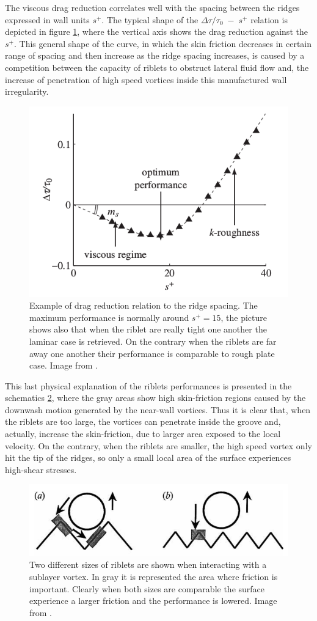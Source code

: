 The viscous drag reduction correlates well with the spacing between the ridges expressed in wall units $ s^+ $. The typical shape of the $\Delta \tau/\tau_0 \; - \; s^+$ relation is depicted in figure \ref{fig:riblets_perf}, where the vertical axis shows the drag reduction against the $s^+$.
This general shape of the curve, in which the skin friction decreases in certain range of spacing and then increase as the ridge spacing  increases, is caused by a competition between the capacity of riblets to obstruct lateral fluid flow and, the increase of penetration of high speed vortices inside this manufactured wall irregularity.

\begin{figure}[h]
	\centering
	\includegraphics[width=0.5\linewidth]{chapter_1/riblets_performance}
	\caption{Example of drag reduction relation to the ridge spacing. The maximum performance is normally around $ s^+ = 15 $, the picture shows also that when the riblet are really tight one another the laminar case is retrieved. On the contrary when the riblets are far away one another their performance is comparable to rough plate case. Image from \citet{jimenez2001turbulent}. }
	\label{fig:riblets_perf}
\end{figure}

This last physical explanation of the riblets performances is presented in the schematics \ref{fig:riblets_schem}, where the gray areas show high skin-friction regions caused by the downwash motion generated by the near-wall vortices.
Thus it is clear that, when the riblets are too large, the vortices can penetrate inside the groove and, actually, increase the skin-friction, due to larger area exposed to the local velocity.
On the contrary, when the riblets are smaller, the high speed vortex only hit the tip of the ridges, so only a small local area of the surface experiences high-shear stresses.

\begin{figure}[h]
	\centering
	\includegraphics[width=0.7\linewidth]{chapter_1/riblets1}
	\caption{Two different sizes of riblets are shown when interacting with a sublayer vortex. In gray it is represented the area where friction is important. Clearly when both sizes are comparable the surface experience a larger friction and the performance is lowered. Image from \citet{choi1993direct}.}
	\label{fig:riblets_schem}
\end{figure}

